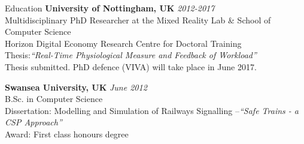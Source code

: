 \documentclass{resume} %
\begin{document}

\begin{rSection}{Education}
{\bf University of Nottingham, UK} \hfill {\em 2012-2017} \\
Multidisciplinary PhD Researcher at the Mixed Reality Lab \& School of Computer Science \\
Horizon Digital Economy Research Centre for Doctoral Training \\
Thesis:\emph{``Real-Time Physiological Measure and Feedback of Workload''}\\
Thesis submitted. PhD defence (VIVA) will take place in June 2017.\smallskip \\
\vspace{-1 mm}

{\bf Swansea University, UK} \hfill {\em June 2012} \\
B.Sc. in Computer Science \\
Dissertation: Modelling and Simulation of Railways Signalling –\emph{``Safe Trains - a CSP Approach''}\smallskip \\
Award: First class honours degree

\end{rSection}
\end{document}
